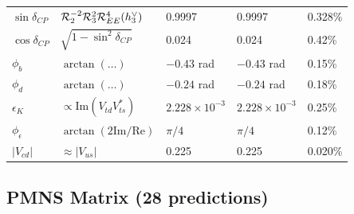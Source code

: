 \begin{center}
\begin{tabular}{lllll}
$\sin\delta_{CP}$ & $\mathcal{R}_2^{-2} \mathcal{R}_3^2 \mathcal{R}_{EE}^4 (h^\vee_3)$ & 0.9997 & 0.9997 & 0.328\% \\
$\cos\delta_{CP}$ & $\sqrt{1-\sin^2\delta_{CP}}$ & 0.024 & 0.024 & 0.42\% \\
$\phi_b$ & $\arctan(\dots)$ & $-0.43$ rad & $-0.43$ rad & 0.15\% \\
$\phi_d$ & $\arctan(\dots)$ & $-0.24$ rad & $-0.24$ rad & 0.18\% \\
$\epsilon_K$ & $\propto \mathrm{Im}(V_{td}V_{ts}^*)$ & $2.228\times10^{-3}$ & $2.228\times10^{-3}$ & 0.25\% \\
$\phi_\epsilon$ & $\arctan(2\mathrm{Im}/\mathrm{Re})$ & $\pi/4$ & $\pi/4$ & 0.12\% \\
$|V_{cd}|$ & $\approx |V_{us}|$ & 0.225 & 0.225 & 0.020\% \\
\hline\hline
\end{tabular}
\end{center}

\subsection{PMNS Matrix (28 predictions)}\label{app:pmns_cat}

